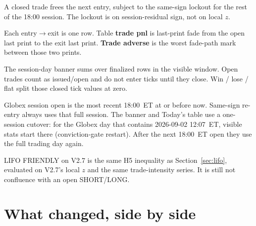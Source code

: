\documentclass[11pt]{article}
\newcommand{\code}[1]{\texttt{\detokenize{#1}}}
\begin{document}
A closed trade frees the next entry, subject to the same-sign
lockout for the rest of the 18:00 session.  The lockout is on
session-residual sign, not on local \(z\).

Each entry\(\rightarrow\)exit is one row.  Table \textbf{trade pnl}
is last-print fade from the open last print to the exit last
print.  \textbf{Trade adverse} is the worst fade-path mark between
those two prints.

The session-day banner sums \code{dir_pnl_trade_ticks} over
finalized rows in the visible window.  Open trades count as
issued/open and do not enter ticks until they close.  Win / lose /
flat split those closed tick values at zero.

Globex session open is the most recent 18:00~ET at or before now.
Same-sign re-entry always uses that full session.  The banner and
Today's table use a one-session cutover: for the Globex day that
contains 2026-09-02 12:07~ET, visible stats start there
(conviction-gate restart).  After the next 18:00~ET open they use
the full trading day again.

LIFO FRIENDLY on V2.7 is the same H5 inequality as
Section~\ref{sec:lifo}, evaluated on V2.7's local \(z\) and the
same trade-intensity series.  It is still not confluence with an
open SHORT/LONG.


\section{What changed, side by side}
\end{document}
